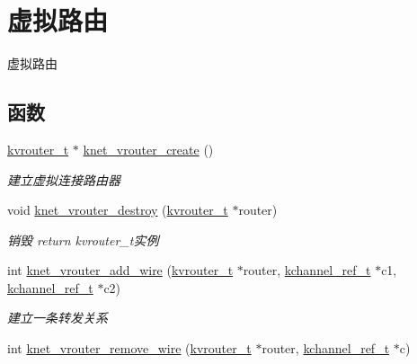 \hypertarget{a00141}{}\section{虚拟路由}
\label{a00141}


虚拟路由  


\subsection*{函数}
\begin{DoxyCompactItemize}
\item 
\hyperlink{a00066_a9863a6202df1fb40e2b32c673ad93267_a9863a6202df1fb40e2b32c673ad93267}{kvrouter\+\_\+t} $\ast$ \hyperlink{a00141_gac2a99e706273f22db2ea363b1700bfab_gac2a99e706273f22db2ea363b1700bfab}{knet\+\_\+vrouter\+\_\+create} ()
\begin{DoxyCompactList}\small\item\em 建立虚拟连接路由器 \end{DoxyCompactList}\item 
void \hyperlink{a00141_gad0660abac611870c1255dcfe9d36f67e_gad0660abac611870c1255dcfe9d36f67e}{knet\+\_\+vrouter\+\_\+destroy} (\hyperlink{a00066_a9863a6202df1fb40e2b32c673ad93267_a9863a6202df1fb40e2b32c673ad93267}{kvrouter\+\_\+t} $\ast$router)
\begin{DoxyCompactList}\small\item\em 销毁 return kvrouter\+\_\+t实例 \end{DoxyCompactList}\item 
int \hyperlink{a00141_ga7256979701c32356201e853b7f3df1ca_ga7256979701c32356201e853b7f3df1ca}{knet\+\_\+vrouter\+\_\+add\+\_\+wire} (\hyperlink{a00066_a9863a6202df1fb40e2b32c673ad93267_a9863a6202df1fb40e2b32c673ad93267}{kvrouter\+\_\+t} $\ast$router, \hyperlink{a00066_a3b7e82599367eade261456f60ebe2cd9_a3b7e82599367eade261456f60ebe2cd9}{kchannel\+\_\+ref\+\_\+t} $\ast$c1, \hyperlink{a00066_a3b7e82599367eade261456f60ebe2cd9_a3b7e82599367eade261456f60ebe2cd9}{kchannel\+\_\+ref\+\_\+t} $\ast$c2)
\begin{DoxyCompactList}\small\item\em 建立一条转发关系 \end{DoxyCompactList}\item 
int \hyperlink{a00141_gaa5052bac7f443e497fcc042f13026bfc_gaa5052bac7f443e497fcc042f13026bfc}{knet\+\_\+vrouter\+\_\+remove\+\_\+wire} (\hyperlink{a00066_a9863a6202df1fb40e2b32c673ad93267_a9863a6202df1fb40e2b32c673ad93267}{kvrouter\+\_\+t} $\ast$router, \hyperlink{a00066_a3b7e82599367eade261456f60ebe2cd9_a3b7e82599367eade261456f60ebe2cd9}{kchannel\+\_\+ref\+\_\+t} $\ast$c)

\end{DoxyCompactItemize}
